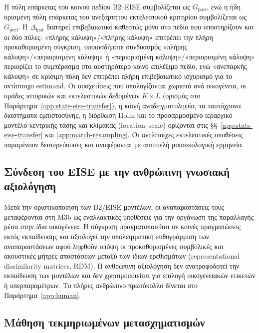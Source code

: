\documentclass[11pt,a4paper]{article}
\begin{document}
Η πύλη επάρκειας του κοινού πεδίου B2--EISE συμβολίζεται ως $G_{\mathrm{pair}}$, ενώ η ήδη ορισμένη πύλη επάρκειας του ανεξάρτητου εκτελεστικού κριτηρίου συμβολίζεται ως $G_{\mathrm{perf}}$. Η $\Delta_{\mathrm{hist}}$ διατηρεί επιβεβαιωτικό καθεστώς μόνο στο πεδίο που υποστηρίζουν και οι δύο πύλες: «πλήρης κάλυψη»/«πλήρης κάλυψη» επιτρέπει την πλήρη προκαθορισμένη σύγκριση, οποιοσδήποτε συνδυασμός «πλήρης κάλυψη»/«περιορισμένη κάλυψη» ή «περιορισμένη κάλυψη»/«περιορισμένη κάλυψη» περιορίζει το συμπέρασμα στο αυστηρότερο κοινό επιλέξιμο πεδίο, ενώ «ανεπαρκής κάλυψη» σε κρίσιμη πύλη δεν επιτρέπει πλήρη επιβεβαιωτικό ισχυρισμό για το αντίστοιχο estimand. Οι συσχετίσεις που υπολογίζονται χωριστά ανά οικογένεια, οι ομάδες ιστορικών και εκτελεστικών δεδομένων $K\times L$ (ορισμός στο Παράρτημα~\ref{app:stats-eise-transfer}), η κοινή αναδειγματοληψία, τα ταυτόχρονα διαστήματα εμπιστοσύνης, η διόρθωση Holm και το προσαρμοσμένο ιεραρχικό μοντέλο κεντρικής τάσης και κλίμακας (location--scale) ορίζονται στις §§~\ref{app:stats-eise-transfer} και \ref{app:match-resampling}. Οι αντίστοιχες εκτελεστικές υποθέσεις παραμένουν δευτερεύουσες και αναφέρονται με αυτοτελή μουσικολογική ερμηνεία.

\subsection{Σύνδεση του EISE με την ανθρώπινη γνωσιακή αξιολόγηση}\label{sec:eise-human-link}

Μετά την οριστικοποίηση των B2/EISE μοντέλων, οι αναπαραστάσεις τους μεταφέρονται στη M3b ως εναλλακτικές υποθέσεις για την οργάνωση της παραλλαγής μέσα στην ίδια οικογένεια. Η σύγκριση πραγματοποιείται σε κοινές πραγματώσεις εκτός εκπαίδευσης και αξιολογεί την υπολειμματική ευθυγράμμιση των αναπαραστάσεων αφού ληφθούν υπόψη οι προκαθορισμένες συμβολικές και ακουστικές μήτρες αποστάσεων μεταξύ των ίδιων ερεθισμάτων (representational dissimilarity matrices, RDM). Η ανθρώπινη αξιολόγηση δεν ανατροφοδοτεί την εκπαίδευση των μοντέλων και δεν χρησιμοποιείται για επιλογή οικογενειακών ετικετών ή υπερπαραμέτρων. Το πλήρες ανθρώπινο πρωτόκολλο δίνεται στο Παράρτημα~\ref{app:human}.

\subsection{Μάθηση τεκμηριωμένων μετασχηματισμών}\label{sec:atl}
\end{document}
